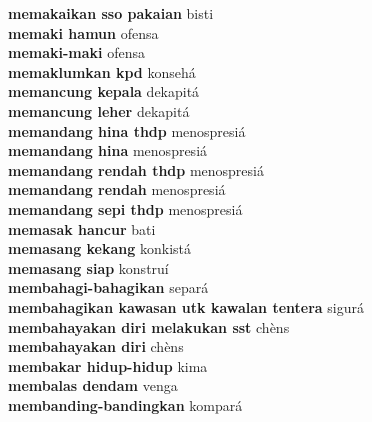 \textbf{ memakaikan sso pakaian  } bisti \\
\textbf{ memaki hamun  } ofensa \\
\textbf{ memaki-maki  } ofensa \\
\textbf{ memaklumkan kpd  } konsehá \\
\textbf{ memancung kepala  } dekapitá \\
\textbf{ memancung leher  } dekapitá \\
\textbf{ memandang hina thdp  } menospresiá \\
\textbf{ memandang hina  } menospresiá \\
\textbf{ memandang rendah thdp  } menospresiá \\
\textbf{ memandang rendah  } menospresiá \\
\textbf{ memandang sepi thdp  } menospresiá \\
\textbf{ memasak hancur  } bati \\
\textbf{ memasang kekang  } konkistá \\
\textbf{ memasang siap  } konstruí \\
\textbf{ membahagi-bahagikan  } separá \\
\textbf{ membahagikan kawasan utk kawalan tentera  } sigurá \\
\textbf{ membahayakan diri melakukan sst  } chèns \\
\textbf{ membahayakan diri  } chèns \\
\textbf{ membakar hidup-hidup  } kima \\
\textbf{ membalas dendam  } venga \\
\textbf{ membanding-bandingkan  } kompará \\
